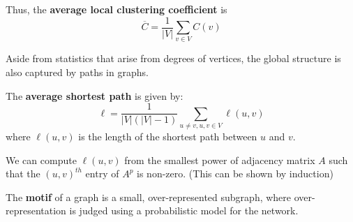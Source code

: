 \documentclass{article}
\begin{document}
Thus, the \textbf{average local clustering coefficient} is 
\[
    \overline{C}=\frac{1}{|V|}\sum_{v \in V} C(v)
\]

Aside from statistics that arise from degrees of vertices, the global structure is also captured by paths in graphs. 

\begin{definition}
    The \textbf{average shortest path} is given by:
    \[
        \ell = \frac{1}{|V|(|V|-1)} \sum_{u\neq v, u,v\in V} \ell (u,v)
    \]
    where $\ell(u,v)$ is the length of the shortest path between $u$ and $v$.
\end{definition}

\begin{remark}
    We can compute $\ell(u,v)$ from the smallest power of adjacency matrix $A$ such that the $(u,v)^{th}$ entry of $A^p$ is non-zero. (This can be shown by induction)
\end{remark}

\begin{definition}
    The \textbf{motif} of a graph is a small, over-represented subgraph, where over-representation is judged using a probabilistic model for the network.
\end{definition}

\newpage


\end{document}
